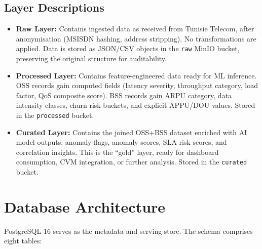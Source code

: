 \subsection{Layer Descriptions}

\begin{itemize}
  \item \textbf{Raw Layer:} Contains ingested data as received from Tunisie Telecom, after anonymisation (MSISDN hashing, address stripping). No transformations are applied. Data is stored as JSON/CSV objects in the \texttt{raw} MinIO bucket, preserving the original structure for auditability.
  
  \item \textbf{Processed Layer:} Contains feature-engineered data ready for ML inference. OSS records gain computed fields (latency severity, throughput category, load factor, QoS composite score). BSS records gain ARPU category, data intensity classes, churn risk buckets, and explicit APPU/DOU values. Stored in the \texttt{processed} bucket.
  
  \item \textbf{Curated Layer:} Contains the joined OSS+BSS dataset enriched with AI model outputs: anomaly flags, anomaly scores, SLA risk scores, and correlation insights. This is the ``gold'' layer, ready for dashboard consumption, CVM integration, or further analysis. Stored in the \texttt{curated} bucket.
\end{itemize}

\section{Database Architecture}

PostgreSQL 16 serves as the metadata and serving store. The schema comprises eight tables:

